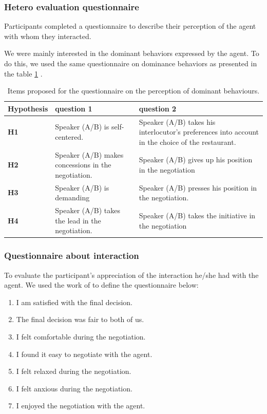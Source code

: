 \documentclass[10pt, a4paper, twocolumn]{article} %
\begin{document}
	\subsubsection{Hetero evaluation questionnaire}
		Participants completed a questionnaire to describe their perception of the agent with whom they interacted.
		
		We were mainly interested in the dominant behaviors expressed by the agent. To do this, we used the same questionnaire on dominance behaviors as presented in the table \ref{table:questionnaire} .
					\begin{table}[b]
						\centering
						\begin{tabular}{|p{1.75cm}|p{4cm}|p{4.8cm}|}
							
							\hline
							Hypothesis &question 1& question 2 \\
							\hline
							\textbf{H1} &Speaker (A/B) is self-centered.&Speaker (A/B) takes his interlocutor's preferences into account in the choice of the restaurant.\\
							\hline
							\textbf{H2} &Speaker (A/B) makes concessions in the negotiation.&Speaker (A/B) gives up his position in the negotiation\\
							\hline
							\textbf{H3} & Speaker (A/B) is demanding&Speaker (A/B) presses his position in the negotiation. \\
							\hline
							\textbf{H4} &Speaker (A/B) takes the lead in the negotiation.&Speaker (A/B) takes the initiative in the negotiation \\
							\hline
						\end{tabular}
						
						\caption{Items proposed for the questionnaire on the perception of dominant behaviours.}
						\label{table:questionnaire}
					\end{table}
					
					
		\subsubsection{Questionnaire about interaction}
		To evaluate the participant's appreciation of the interaction he/she had with the agent. We used the work of \cite{tiedens2003power,wiltermuth2009benefits,olekalns2013dyadic} to define the questionnaire below:
		
		\begin{enumerate}
		\item I am satisfied with the final decision.
		\item The final decision was fair to both of us.
		\item I felt comfortable during the negotiation.
		\item I found it easy to negotiate with the agent.
		\item I felt relaxed during the negotiation.
		\item I felt anxious during the negotiation.
		\item I enjoyed the negotiation with the agent.
	\end{enumerate}
	
\end{document}
